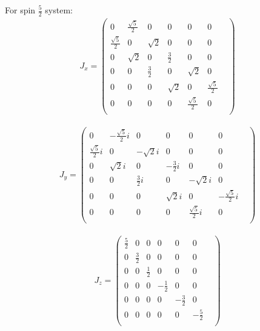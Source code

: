 \documentclass[10pt,a4paper]{article}
\begin{document}
For spin $\frac{5}{2}$ system:\begin{align}
J_x = \begin{pmatrix}
0&\frac{\sqrt{5}}{2}&0&0&0&0&\\\frac{\sqrt{5}}{2}&0&\sqrt{2}&0&0&0&\\0&\sqrt{2}&0&\frac{3}{2}&0&0&\\0&0&\frac{3}{2}&0&\sqrt{2}&0&\\0&0&0&\sqrt{2}&0&\frac{\sqrt{5}}{2}&\\0&0&0&0&\frac{\sqrt{5}}{2}&0&\\\end{pmatrix}\end{align}

\begin{align}
J_y = \begin{pmatrix}
0&-\frac{\sqrt{5}}{2}i&0&0&0&0&\\\frac{\sqrt{5}}{2}i&0&-\sqrt{2}i&0&0&0&\\0&\sqrt{2}i&0&-\frac{3}{2}i&0&0&\\0&0&\frac{3}{2}i&0&-\sqrt{2}i&0&\\0&0&0&\sqrt{2}i&0&-\frac{\sqrt{5}}{2}i&\\0&0&0&0&\frac{\sqrt{5}}{2}i&0&\\\end{pmatrix}\end{align}

\begin{align}
J_z = \begin{pmatrix}
\frac{5}{2}&0&0&0&0&0&\\0&\frac{3}{2}&0&0&0&0&\\0&0&\frac{1}{2}&0&0&0&\\0&0&0&-\frac{1}{2}&0&0&\\0&0&0&0&-\frac{3}{2}&0&\\0&0&0&0&0&-\frac{5}{2}&\\\end{pmatrix}\end{align}
\end{document}
